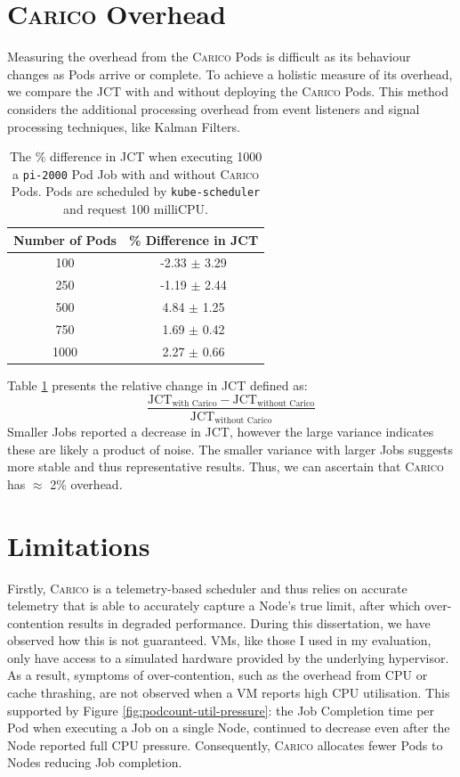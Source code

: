 \section{\textsc{Carico} Overhead}
\label{sec:eval-overhead}
Measuring the overhead from the \textsc{Carico} Pods is difficult as its
behaviour changes as Pods arrive or complete. To achieve a holistic measure of
its overhead, we compare the JCT with and without deploying
the \textsc{Carico} Pods. This method considers the additional processing
overhead from event listeners and signal processing techniques, like Kalman
Filters.

\begin{table}[ht!]
\centering
    \begin{tabular}{|c|c|}
    \hline
    \textbf{Number of Pods} & \textbf{\% Difference in JCT} \\
    \hline
        100 & -2.33 $\pm$ 3.29 \\
        250 & -1.19 $\pm$ 2.44 \\
        500 & 4.84  $\pm$ 1.25 \\
        750 & 1.69  $\pm$ 0.42 \\
        1000 & 2.27  $\pm$ 0.66 \\
    \hline
    \end{tabular}
    \caption{The \% difference in JCT when executing 1000 a \texttt{pi-2000}
    Pod Job with and without \textsc{Carico} Pods. Pods are scheduled by
    \texttt{kube-scheduler} and request 100 milliCPU.}
    \label{tab:overhead}
\end{table}

Table \ref{tab:overhead} presents the relative change in JCT defined as:
\[
\frac{\text{JCT}_{\text{with Carico}} - \text{JCT}_{\text{without
Carico}}}{\text{JCT}_{\text{without Carico}}}
\]
Smaller Jobs reported a decrease
in JCT, however the large variance indicates these are likely a product of
noise. The smaller variance with larger Jobs suggests more stable and thus
representative results. Thus, we can ascertain that \textsc{Carico} has
$\approx$ 2\% overhead.

\section{Limitations}

Firstly, \textsc{Carico} is a telemetry-based scheduler and thus relies on accurate
telemetry that is able to accurately capture a Node's true limit, after which
over-contention results in degraded performance. During this dissertation, we
have observed how this is not guaranteed. VMs, like those I used in my
evaluation, only have access to a simulated hardware provided by the underlying
hypervisor. As a result, symptoms of over-contention, such as the overhead from
CPU or cache thrashing, are not observed when a VM reports high CPU utilisation.
This supported by Figure \ref{fig:podcount-util-pressure}: the Job Completion
time per Pod when executing a Job on a single Node, continued to decrease even
after the Node reported full CPU pressure. Consequently, \textsc{Carico}
allocates fewer Pods to Nodes reducing Job completion.

